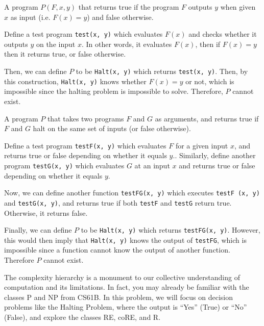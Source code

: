 \documentclass[11pt]{article}
\begin{document}
\begin{Parts}

\Part A program $P(F,x,y)$ that returns true if the program $F$ outputs $y$ when given $x$ as input (i.e. $F(x)=y$) and false otherwise.

\begin{solution}
  Define a test program \texttt{test(x, y)} which evaluates $F(x)$ and checks whether it outputs $y$ on the input $x$. In other words, it evaluates $F(x)$, then if $F(x) = y$ then it returns true, or false otherwise.  
  
  Then, we can define $P$ to be \texttt{Halt(x, y)} which returns \texttt{test(x, y)}. Then, by this construction, \texttt{Halt(x, y)} knows whether $F(x) = y$ or not, which is impossible since the halting problem is impossible to solve. Therefore, $P$ cannot exist.
\end{solution}

\Part A program $P$ that takes two programs $F$ and $G$ as arguments, and returns true if $F$ and $G$ halt on the same set of inputs (or false otherwise).

\begin{solution}
  Define a test program \texttt{testF(x, y)} which evaluates $F$ for a given input $x$, and returns true or false depending on whether it equals $y$.. Similarly, define another program \texttt{testG(x, y)} which evaluates $G$ at an input $x$ and returns true or false depending on whether it equals $y$. 

  Now, we can define another function \texttt{testFG(x, y)} which executes \texttt{testF (x, y)} and \texttt{testG(x, y)}, and returns true if both \texttt{testF} and \texttt{testG} return true. Otherwise, it returns false.

  Finally, we can define $P$ to be \texttt{Halt(x, y)} which returns \texttt{testFG(x, y)}. However, this would then imply that \texttt{Halt(x, y)} knows the output of \texttt{testFG}, which is impossible since a function cannot know the output of another function. Therefore $P$ cannot exist.
\end{solution}

\end{Parts}

\pagebreak
{}

The complexity hierarchy is a monument to our collective understanding of computation and its limitations.
In fact, you may already be familiar with the classes \textsf{P} and \textsf{NP} from CS61B.
In this problem, we will focus on decision problems like the Halting Problem, where the output is ``Yes'' (True) or ``No'' (False), and explore the classes \textsf{RE}, \textsf{coRE}, and \textsf{R}.
\end{document}
